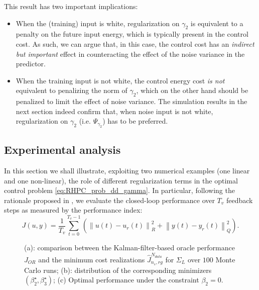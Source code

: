 \documentclass[letterpaper, 10 pt, conference]{ieeeconf}  %
\begin{document}
This result has two important implications:
\begin{itemize}
	\item  When the (training) input is white, regularization on $\gamma_2$ is equivalent to a penalty on the future input energy, which is typically present in the control cost. As such, we can  argue that, in this case, the control cost has an \textit{indirect but important} effect in counteracting the effect of the noise variance in the predictor.
	\item When the training input is not white, the control energy cost \emph{is not} equivalent to penalizing the norm of $\gamma_2$, which on the other hand should be penalized to limit the effect of noise variance. The simulation results in the next section indeed confirm that, when noise input is not white, regularization on $\gamma_2$ (i.e. $\Psi_{\gamma_2}$) has to be preferred.
\end{itemize}
\subsection{Experimental analysis}\label{sec:examples}
In this section we shall illustrate, exploiting two numerical examples (one linear and one non-linear), the role of different  regularization terms in the optimal control problem \eqref{eq:RHPC_prob_dd_gamma}. In particular,  following the rationale proposed in \cite{dorfler2022bridging}, we evaluate the  closed-loop performance over $T_v$ feedback steps as measured by the performance index:
\begin{equation}\label{eq:general_perf_index}
	J(u,y)\!=\!  \dfrac{1}{T_{v}}\!\sum\limits_{t=0}^{T_{v}-1}\!\!\left( \left\|u(t)\!-\!u_r(t) \right\|^{2}_{R} \!+\! \left\|y(t)\!-\!y_{r}(t) \right\|^{2}_{Q}\right) .
\end{equation}
\begin{figure}[h!]
	\centering
	\subfigure[Optimal performance under constraint $\beta_2=0$]
	{\texttt{[image: ./images\_CDC23/performances\_b2=0]}\label{fig:performances_b2=0}}
	\caption{(a): comparison between the Kalman-filter-based oracle performance $J_{OR}$ and the minimum cost realizations $\widehat{J}^{N_{data}}_{n_s,rg}$ for $\Sigma_{L}$ over $100$ Monte Carlo runs; (b): distribution of the corresponding minimizers $(\beta_2^\star,\beta_3^\star)$; (c) Optimal performance under the constraint $\beta_2=0$.}
	\label{fig:Markovski_costs}
\end{figure}
\end{document}
